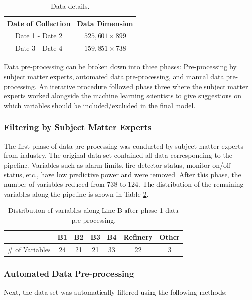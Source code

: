\begin{table}[h]
    \centering
    {
    \begin{tabular}{ c | c }
        Date of Collection     &      Data Dimension      \\
        \hline
        Date 1 - Date 2  &    $525,601 \times 899$   \\
        Date 3 - Date 4 &    $159,851 \times 738$   \\
    \end{tabular}}
    \caption{Data details.}
    \label{tab:08data}
\end{table}

Data pre-processing can be broken down into three phases: Pre-processing by subject matter experts, automated data pre-processing, and manual data pre-processing.  An iterative procedure followed phase three where the subject matter experts worked alongside the machine learning scientists to give suggestions on which variables should be included/excluded in the final model.

\subsubsection{Filtering by Subject Matter Experts}
The first phase of data pre-processing was conducted by subject matter experts from industry.  The original data set contained all data corresponding to the pipeline.  Variables such as alarm limits, fire detector status, monitor on/off status, etc., have low predictive power and were removed.  After this phase, the number of variables reduced from 738 to 124. The distribution of the remaining variables along the pipeline is shown in Table \ref{tab:08Ph1Data}.
\begin{table}[h]
    \centering
    {
    \begin{tabular}{ c | c | c | c | c | c | c}
             & B1 & B2 & B3 & B4 & Refinery & Other      \\
        \hline
        \# of Variables  &  24  &  21  &  21  &  33  &  22  &  3  \\
    \end{tabular}}
    \caption{Distribution of variables along Line B after phase 1 data pre-processing.}
    \label{tab:08Ph1Data}
\end{table}

\subsubsection{Automated Data Pre-processing}
Next, the data set was automatically filtered using the following methods:

